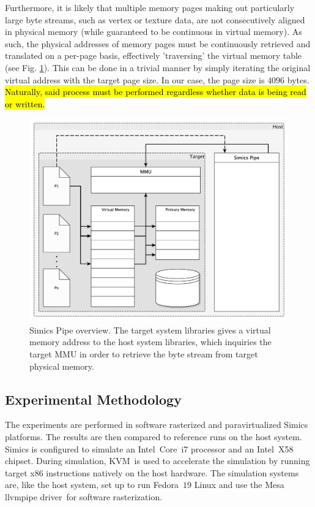 Furthermore, it is likely that multiple memory pages making out particularly large byte streams, such as vertex or texture data, are not consecutively aligned in physical memory (while guaranteed to be continuous in virtual memory).
As such, the physical addresses of memory pages must be continuously retrieved and translated on a per-page basis, effectively 'traversing' the virtual memory table (see Fig. \ref{fig:virtualmemory}).
This can be done in a trivial manner by simply iterating the original virtual address with the target page size.
In our case, the page size is $4096$ bytes.
\hl{Naturally, said process must be performed regardless whether data is being read or written.}

\begin{figure}
\centering
\includegraphics[width=\linewidth]{img/yedvirtualmemory.pdf}
\caption{Simics Pipe overview. The target system libraries gives a virtual memory address to the host system libraries, which inquiries the target MMU in order to retrieve the byte stream from target physical memory.}
\label{fig:virtualmemory}
\end{figure}

\subsection{Experimental Methodology}
\label{sec:experimentalmethodology}
The experiments are performed in software rasterized and paravirtualized Simics platforms.
The results are then compared to reference runs on the host system.
Simics is configured to simulate an Intel\circledR ~Core\texttrademark ~i7 processor and an Intel\circledR ~X58 chipset.
During simulation, KVM\ is used to accelerate the simulation by running target x86 instructions natively on the host hardware.
The simulation systems are, like the host system, set up to run Fedora~$19$ Linux and use the Mesa llvmpipe driver\ for software rasterization.

